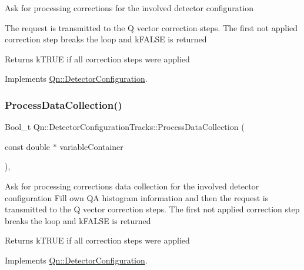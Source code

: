 Ask for processing corrections for the involved detector configuration

The request is transmitted to the Q vector correction steps. The first not applied correction step breaks the loop and k\+F\+A\+L\+SE is returned \begin{DoxyReturn}{Returns}
k\+T\+R\+UE if all correction steps were applied 
\end{DoxyReturn}


Implements \mbox{\hyperlink{classQn_1_1DetectorConfiguration_aad0610bd5d168c29a32025ddf641e3fc}{Qn\+::\+Detector\+Configuration}}.

\mbox{\label{classQn_1_1DetectorConfigurationTracks_ab47360b36191cf52c8c9227c3f90fc85}} 
\subsubsection{\texorpdfstring{Process\+Data\+Collection()}{ProcessDataCollection()}}
{\footnotesize\ttfamily Bool\+\_\+t Qn\+::\+Detector\+Configuration\+Tracks\+::\+Process\+Data\+Collection (\begin{DoxyParamCaption}\item[{const double $\ast$}]{variable\+Container }\end{DoxyParamCaption})\hspace{0.3cm}{\ttfamily [inline]}, {\ttfamily [virtual]}}

Ask for processing corrections data collection for the involved detector configuration Fill own QA histogram information and then the request is transmitted to the Q vector correction steps. The first not applied correction step breaks the loop and k\+F\+A\+L\+SE is returned \begin{DoxyReturn}{Returns}
k\+T\+R\+UE if all correction steps were applied 
\end{DoxyReturn}


Implements \mbox{\hyperlink{classQn_1_1DetectorConfiguration_ac78ed44b460217fda7d094cc102504c4}{Qn\+::\+Detector\+Configuration}}.

\mbox{\label{classQn_1_1DetectorConfigurationTracks_a7f28703d7e981a3a0c2fe89116194087}} 
